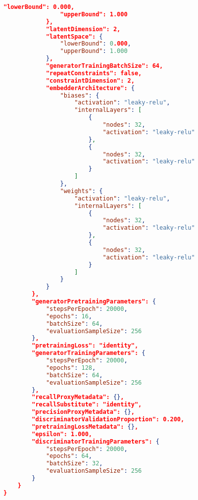 \documentclass[../main.tex]{subfiles}
\begin{document}
\begin{lstlisting}[language=json,firstnumber=1,caption={The output of a typical experiment, automatically logged when the experiment concludes.},captionpos=b]
                "lowerBound": 0.000,
                "upperBound": 1.000
            },
            "latentDimension": 2,
            "latentSpace": {  
                "lowerBound": 0.000,
                "upperBound": 1.000
            },
            "generatorTrainingBatchSize": 64,
            "repeatConstraints": false,
            "constraintDimension": 2,
            "embedderArchitecture": {  
                "biases": {  
                    "activation": "leaky-relu",
                    "internalLayers": [  
                        {  
                            "nodes": 32,
                            "activation": "leaky-relu"
                        },
                        {  
                            "nodes": 32,
                            "activation": "leaky-relu"
                        }
                    ]
                },
                "weights": {  
                    "activation": "leaky-relu",
                    "internalLayers": [  
                        {  
                            "nodes": 32,
                            "activation": "leaky-relu"
                        },
                        {  
                            "nodes": 32,
                            "activation": "leaky-relu"
                        }
                    ]
                }
            }
        },
        "generatorPretrainingParameters": {  
            "stepsPerEpoch": 20000,
            "epochs": 16,
            "batchSize": 64,
            "evaluationSampleSize": 256
        },
        "pretrainingLoss": "identity",
        "generatorTrainingParameters": {  
            "stepsPerEpoch": 20000,
            "epochs": 128,
            "batchSize": 64,
            "evaluationSampleSize": 256
        },
        "recallProxyMetadata": {},
        "recallSubstitute": "identity",
        "precisionProxyMetadata": {},
        "discriminatorValidationProportion": 0.200,
        "pretrainingLossMetadata": {},
        "epsilon": 1.000,
        "discriminatorTrainingParameters": {  
            "stepsPerEpoch": 20000,
            "epochs": 64,
            "batchSize": 32,
            "evaluationSampleSize": 256
        }
    }
}
\end{lstlisting}
\end{document}
